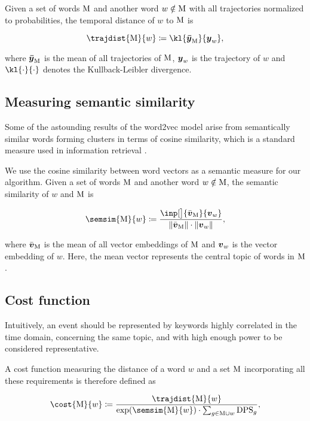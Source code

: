 Given a set of words $\text{M}$ and another word $w \notin \text{M}$ with all trajectories normalized to probabilities, the temporal distance of $w$ to $\text{M}$ is

\begin{equation}
	\trajdist{\featset}{w} \coloneqq \kl{\vect{\bar{\traj}}_{\featset}}{\vect{\traj}_{w}},
\end{equation}

where $\vect{\bar{\traj}}_{\featset}$ is the mean of all trajectories of $\text{M}$, $\vect{\traj}_{w}$ is the trajectory of $w$ and $\kl{\cdot}{\cdot}$ denotes the Kullback-Leibler divergence.


\subsection{Measuring semantic similarity}
Some of the astounding results of the word2vec model arise from semantically similar words forming clusters \cite{linguistic-regularities} in terms of cosine similarity, which is a standard measure used in information retrieval \cite{information-retrieval, cosine-similarity}.

We use the cosine similarity between word vectors as a semantic measure for our algorithm. Given a set of words $\text{M}$ and another word $w \notin \text{M}$, the semantic similarity of $w$ and $\text{M}$ is

\begin{equation}
	\semsim{\featset}{w} \coloneqq \frac{\inp[\big]{\bar{\embed}_{\featset}}{\embed_{w}}}{\| \bar{\embed}_{\featset} \| \cdot \| \embed_{w} \|},
\end{equation}

where $\bar{\embed}_{\featset}$ is the mean of all vector embeddings of $\text{M}$ and $\embed_{w}$ is the vector embedding of $w$. Here, the mean vector represents the central topic of words in $\text{M}$.


\subsection{Cost function}
Intuitively, an event should be represented by keywords highly correlated in the time domain, concerning the same topic, and with high enough power to be considered representative.

A cost function measuring the distance of a word $w$ and a set $\text{M}$ incorporating all these requirements is therefore defined as

\begin{equation} \label{eq:cost-function}
	\cost{\featset}{w} \coloneqq \frac{\trajdist{\featset}{w}}{\exp(\semsim{\featset}{w}) \cdot \sum_{g \in \featset \cup w}{\text{DPS}_{g}}},
\end{equation}

